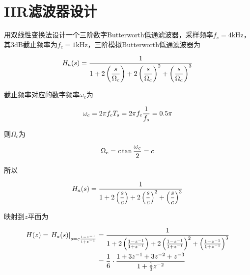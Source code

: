 \documentclass[cn, hazy, blue, normal, 14pt]{elegantnote}
\begin{document}
\section{IIR滤波器设计}

\begin{exercise}

用双线性变换法设计一个三阶数字Butterworth低通滤波器，采样频率$f_s=4\text{kHz}$，其3dB截止频率为$f_c=1\text{kHz}$，三阶模拟Butterworth低通滤波器为

\begin{equation}
\notag
    H_a(s)=\dfrac{1}{1+2\left(\dfrac{s}{\Omega_c}\right)+2\left(\dfrac{s}{\Omega_c}\right)^2+\left(\dfrac{s}{\Omega_c}\right)^3}
\end{equation}

\end{exercise}

\begin{solution}[print=false]

截止频率对应的数字频率$\omega_c$为

\begin{equation}
\notag
    \omega_c=2\pi  f_c T_s=2\pi f_c\dfrac{1}{f_s}=0.5\pi
\end{equation}

则$\Omega_c$为

\begin{equation}
\notag
    \Omega_c=c\tan\dfrac{\omega_c}{2}=c
\end{equation}

所以

\begin{equation}
\notag
    H_a(s)=\dfrac{1}{1+2\left(\dfrac{s}{c}\right)+2\left(\dfrac{s}{c}\right)^2+\left(\dfrac{s}{c}\right)^3}
\end{equation}

映射到$z$平面为

\begin{equation}
\notag
\begin{aligned}
    H(z)=\left.H_a(s)\right|_{s=c\frac{1-z^{-1}}{1+z^{-1}}}&=\dfrac{1}{1+2\left(\frac{1-z^{-1}}{1+z^{-1}}\right)+2\left(\frac{1-z^{-1}}{1+z^{-1}}\right)^2+\left(\frac{1-z^{-1}}{1+z^{-1}}\right)^3} \\
    &=\frac{1}{6}\cdot\frac{1+3z^{-1}+3z^{-2}+z^{-3}}{1+\frac{1}{3}z^{-2}}
\end{aligned}
\end{equation}

\end{solution}
\end{document}
